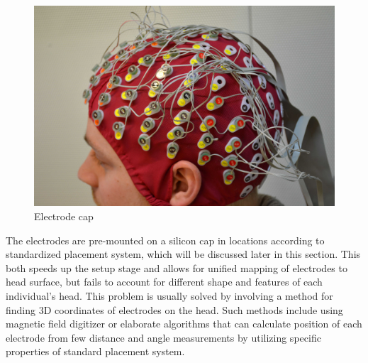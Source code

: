 \begin{figure}[ht]
	\centering
	\includegraphics[width=1\linewidth]{fig/eegCap.jpg}
	\caption[Caption for LOF]{Electrode cap\protect\footnotemark}
	\label{fig:eegCap}
\end{figure}

The electrodes are pre-mounted on a silicon cap in locations according to
standardized placement system, which will be discussed later in this section.
This both speeds up the setup stage and allows for unified mapping of electrodes
to head surface, but fails to account for different shape and features of each
individual's head. \cite{eegFund} This problem is usually solved by involving a
method for finding 3D coordinates of electrodes on the head. Such methods
include using magnetic field digitizer or elaborate algorithms that can
calculate position of each electrode from few distance and angle measurements by
utilizing specific properties of standard placement system. \cite{rapidPos}

